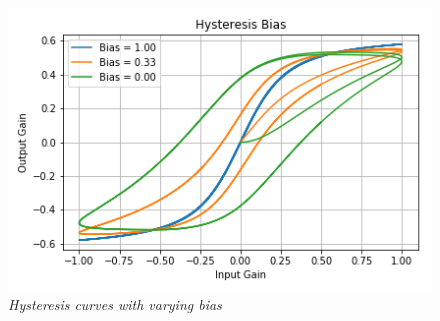 \documentclass[landscape,twocolumn,a5paper]{manual}
\begin{document}
\begin{figure}[]
    \center
    \includegraphics[width=0.85\columnwidth]{../Simulations/Hysteresis/bias.png}
    \caption{\label{h_bias}{\it Hysteresis curves with varying bias}}
\end{figure}
\end{document}
